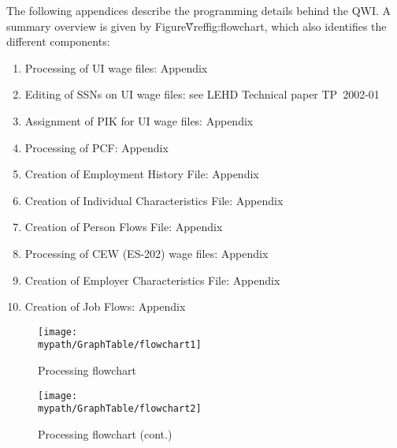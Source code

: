                       

%
%

The following appendices describe the programming details behind the QWI. A
summary overview is given by Figure\~Vref{fig:flowchart}, which also
identifies the different components:

\begin{enumerate}
\item  Processing of UI wage files: Appendix~
\item  Editing of SSNs on UI wage files: see LEHD Technical paper TP~2002-01
\item  Assignment of PIK for  UI wage files: Appendix~
\item  Processing of PCF: Appendix~
\item  Creation of Employment History File: Appendix~
\item  Creation of Individual Characteristics File: Appendix~
\item  Creation of Person Flows File: Appendix~
\item  Processing of CEW (ES-202) wage files: Appendix~
\item  Creation of Employer Characteristics File: Appendix~
\item Creation of Job Flows: Appendix~
\end{enumerate}

\begin{figure}[htbp]
  \begin{center}
    \centerline{\texttt{[image: \\mypath/GraphTable/flowchart1]}}
    \caption{Processing flowchart}
    \label{fig:flowchart}
  \end{center}
\end{figure}
\addtocounter{figure}{-1}
\begin{figure}[htbp]
  \begin{center}
  \centerline{\texttt{[image: \\mypath/GraphTable/flowchart2]}}    
    \caption{Processing flowchart (cont.)}

  \end{center}
\end{figure}




